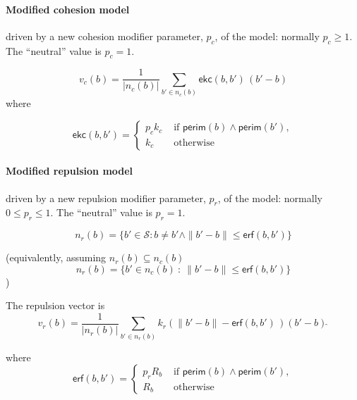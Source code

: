 \documentclass[12pt,a4paper]{article}
\begin{document}
\paragraph{Modified cohesion model} driven by a new cohesion modifier parameter, $p_c$, of the model: normally $p_c \ge 1$. The ``neutral'' value is $p_c = 1$.

\begin{equation}\label{eq:coh3}
v_c(b) = \frac{1}{|n_c(b)|} \sum_{b' \in n_c(b)}\mathsf{ekc}(b, b')\, (b' - b)
\end{equation}
where

\begin{equation}\label{eq:coh4}
\mathsf{ekc}(b, b') = \begin{cases}
   p_c k_c & \text{ if } \mathsf{perim}(b) \wedge \mathsf{perim}(b'),\\
   k_c  & \text{ otherwise }
   \end{cases}
\end{equation}


\paragraph{Modified repulsion model} driven by a new repulsion modifier parameter, $p_r$, of the model: normally $0 \le p_r \le 1$. The ``neutral'' value is $p_r = 1$.

\begin{equation}\label{eq:repulsion1}
n_r(b) = \{b' \in \mathcal{S} : b \neq b' \land \|b' -b\| \leq \mathsf{erf}(b,b')\}
\end{equation}

(equivalently, assuming $n_r(b) \subseteq n_c(b)$
\begin{equation}\label{eq:repulsion3}
n_r(b) = \{b' \in n_c(b)~:~\|b'-b\| \leq \mathsf{erf}(b,b')\}
\end{equation}
)

The repulsion vector is
\begin{equation}\label{eq:rep3}
v_r(b) = \frac{1}{|n_r(b)|}\sum_{b' \in n_r(b)} k_r \left(\|b' - b\| - \mathsf{erf}(b,b') \, \right) (b'-b)\hat~
\end{equation}

where
\begin{equation}\label{eq:rep4}
\mathsf{erf}(b, b') = \begin{cases}
   p_r R_b & \text{ if } \mathsf{perim}(b) \wedge \mathsf{perim}(b'),\\
   R_b  & \text{ otherwise }
   \end{cases}
\end{equation}
\end{document}
